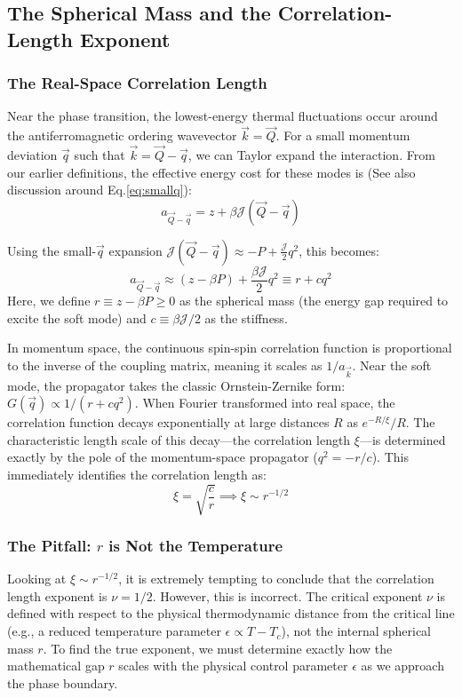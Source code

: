 \documentclass[11pt,a4paper]{article}
\newcommand{\Jc}{\mathcal{J}}
\newcommand{\bk}{\vec k}
\newcommand{\bQ}{\vec Q}
\newcommand{\bq}{\vec q}
\newcommand{\Jc}{\mathcal{J}}
\newcommand{\bk}{\vec k}
\newcommand{\bQ}{\vec Q}
\newcommand{\bq}{\vec q}
\begin{document}
\subsection{The Spherical Mass and the Correlation-Length Exponent}
\label{sec:nu}

\subsubsection*{The Real-Space Correlation Length}
Near the phase transition, the lowest-energy thermal fluctuations occur around the antiferromagnetic ordering wavevector $\bk = \bQ$. For a small momentum deviation $\bq$ such that $\bk = \bQ - \bq$, we can Taylor expand the interaction. From our earlier definitions, the effective energy cost for these modes is (See also discussion around Eq.\ref{eq:smallq}):
$$a_{\bQ-\bq} = z + \beta \Jc(\bQ-\bq)$$

Using the small-$\bq$ expansion $\Jc(\bQ-\bq) \approx -P + \frac{\Jc}{2}q^2$, this becomes:
$$a_{\bQ-\bq} \approx (z - \beta P) + \frac{\beta \Jc}{2} q^2 \equiv r + c q^2$$
Here, we define $r \equiv z - \beta P \geq 0$ as the spherical mass (the energy gap required to excite the soft mode) and $c \equiv \beta \Jc / 2$ as the stiffness.

In momentum space, the continuous spin-spin correlation function is proportional to the inverse of the coupling matrix, meaning it scales as $1/a_{\bk}$. Near the soft mode, the propagator takes the classic Ornstein-Zernike form: $G(\bq) \propto 1 / (r + c q^2)$. When Fourier transformed into real space, the correlation function decays exponentially at large distances $R$ as $e^{-R/\xi} / R$. The characteristic length scale of this decay---the correlation length $\xi$---is determined exactly by the pole of the momentum-space propagator ($q^2 = -r/c$). This immediately identifies the correlation length as:
$$\xi = \sqrt{\frac{c}{r}} \implies \xi \sim r^{-1/2}$$

\subsubsection*{The Pitfall: $r$ is Not the Temperature}
Looking at $\xi \sim r^{-1/2}$, it is extremely tempting to conclude that the correlation length exponent is $\nu = 1/2$. However, this is incorrect. The critical exponent $\nu$ is defined with respect to the physical thermodynamic distance from the critical line (e.g., a reduced temperature parameter $\epsilon \propto T - T_c$), not the internal spherical mass $r$. To find the true exponent, we must determine exactly how the mathematical gap $r$ scales with the physical control parameter $\epsilon$ as we approach the phase boundary.
\end{document}
